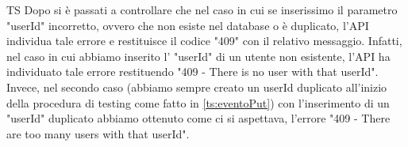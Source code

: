 \begin{listaPersonale}{TS}
                Dopo si è passati a controllare che nel caso in cui se inserissimo il parametro "userId" incorretto, ovvero che non esiste nel database o è duplicato, l'API individua tale errore e restituisce il codice "409" con il relativo messaggio. Infatti, nel caso in cui abbiamo inserito l' "userId" di un utente non esistente, l'API ha individuato tale errore restituendo "409 - There is no user with that userId". Invece, nel secondo caso (abbiamo sempre creato un userId duplicato all'inizio della procedura di testing come fatto in \ref{ts:eventoPut}) con l'inserimento di un "userId" duplicato abbiamo ottenuto come ci si aspettava, l'errore "409 - There are too many users with that userId".
\end{listaPersonale}